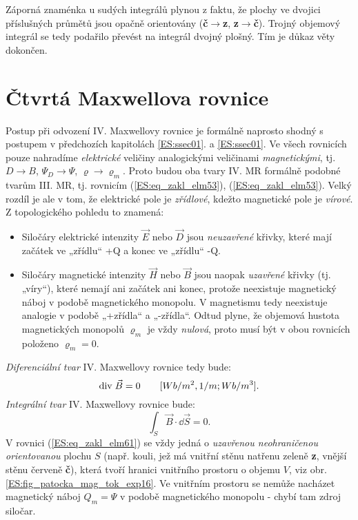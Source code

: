       Záporná znaménka u sudých integrálů plynou z faktu, že plochy ve dvojici příslušných průmětů 
      jsou opačně orientovány (\textbf{č}\(\rightarrow\)\textbf{z}, 
      \textbf{z}\(\rightarrow\)\textbf{č}). Trojný objemový integrál se tedy podařilo převést 
      na integrál dvojný plošný. Tím je důkaz věty dokončen.
      
  \section{Čtvrtá Maxwellova rovnice}\label{ES:sec09}
    Postup při odvození IV. Maxwellovy rovnice je formálně naprosto shodný s postupem v předchozích 
    kapitolách \ref{ES:ssec01}. a \ref{ES:ssec01}. Ve všech rovnicích pouze nahradíme 
    \emph{elektrické} veličiny analogickými veličinami \emph{magnetickými}, tj. \(D\rightarrow 
    B\), \(\Psi_D\rightarrow \Psi\), \(\varrho\rightarrow \varrho_m\). Proto budou oba 
    tvary IV. MR formálně podobné tvarům III. MR, tj. rovnicím (\ref{ES:eq_zakl_elm53}), 
    (\ref{ES:eq_zakl_elm53}). Velký rozdíl je ale v tom, že elektrické pole je \emph{zřídlové}, 
    kdežto magnetické pole je \emph{vírové}. Z topologického pohledu to znamená:
    \begin{itemize}[noitemsep]
      \item Siločáry elektrické intenzity \(\vec{E}\) nebo \(\vec{D}\) jsou \emph{neuzavřené} 
            křivky, které mají začátek ve „zřídlu“ +Q a konec ve „zřídlu“ -Q.
    
      \item Siločáry magnetické intenzity \(\vec{H}\) nebo \(\vec{B}\) jsou naopak \emph{uzavřené} 
            křivky (tj. „víry“), které  nemají ani začátek ani konec, protože neexistuje magnetický 
            náboj v podobě magnetického monopolu. V magnetismu tedy neexistuje analogie v podobě 
            „+zřídla“ a „-zřídla“. Odtud plyne, že objemová hustota magnetických monopolů 
            \(\varrho_m\) je vždy \emph{nulová}, proto musí být v obou rovnicích položeno 
            \(\varrho_m = 0\).
    \end{itemize}
    \emph{Diferenciální tvar} IV. Maxwellovy rovnice tedy bude:
    \begin{equation}\label{ES:eq_zakl_elm60}
      \mathrm{div}\;\vec{B} = 0 \qquad [Wb/m^2,1/m; Wb/m^3].
    \end{equation}
    \emph{Integrální tvar} IV. Maxwellovy rovnice bude:
    \begin{equation}\label{ES:eq_zakl_elm61}
      \int_S\vec{B}\cdot \dd{\vec{S}} = 0.
    \end{equation}    
    V rovnici (\ref{ES:eq_zakl_elm61}) se vždy jedná o \emph{uzavřenou neohraničenou orientovanou} 
    plochu \(S\) (např. kouli, jež má vnitřní stěnu natřenu zeleně \textbf{z}, vnější stěnu červeně 
    \textbf{č}), která tvoří hranici vnitřního prostoru o objemu \(V\), viz obr. 
    \ref{ES:fig_patocka_mag_tok_exp16}. Ve vnitřním prostoru se nemůže nacházet magnetický náboj 
    \(Q_m = \Psi\) v podobě magnetického monopolu - chybí tam zdroj siločar.
   
